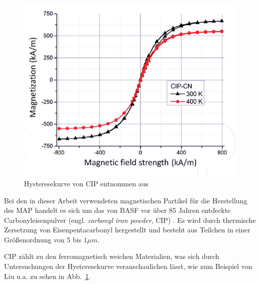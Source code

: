 \begin{figure}
	\centering
	\includegraphics[width=\linewidth]{Bilder/Hysterese.png}
	\caption{Hysteresekurve von CIP entnommen aus \cite[Abb.4]{Magnetorheological_Elastomers}}
	\label{Hysterese}
	\vspace{-0.6cm}
\end{figure}
Bei den in dieser Arbeit verwendeten magnetischen Partikel für die Herstellung des MAP handelt es sich um das von BASF vor über 85 Jahren entdeckte Carbonyleisenpulver (engl. \textit{carbonyl iron powder}, CIP) \cite{basf_cip_allg}. 
Es wird durch thermische Zersetzung von Eisenpentacarbonyl hergestellt und besteht aus Teilchen in einer Größenordnung von 5 bis $1 \unit{\mu m}$.

%
CIP zählt zu den ferromagnetisch weichen Materialien, was sich durch Untersuchungen der Hysteresekurve veranschaulichen lässt, wie zum Beispiel von Liu u.a. \cite{Magnetorheological_Elastomers} zu sehen in Abb.~\ref{Hysterese}.






